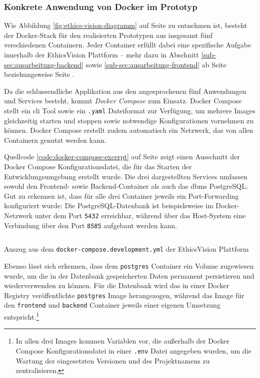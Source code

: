 \documentclass[a4paper,12pt,twoside,numbers=noendperiod]{scrreprt}
\begin{document}
\subsubsection*{Konkrete Anwendung von Docker im Prototyp}
\label{anwendung-docker}

Wie Abbildung \ref{fig:ethics-vision-diagramm} auf Seite \pageref{fig:ethics-vision-diagramm} zu entnehmen ist, besteht der Docker-Stack für den realisierten Prototypen aus insgesamt fünf verschiedenen Containern. Jeder Container erfüllt dabei eine spezifische Aufgabe innerhalb der EthicsVision Plattform -- mehr dazu in Abschnitt \ref{sub-sec:ausarbeitung-backend} sowie \ref{sub-sec:ausarbeitung-frontend} ab Seite \pageref{sub-sec:ausarbeitung-backend} beziehungsweise Seite \pageref{sub-sec:ausarbeitung-frontend}.

\medskip

Da die schlussendliche Applikation aus den angesprochenen fünf Anwendungen und Services besteht, kommt \textit{Docker Compose} zum Einsatz. Docker Compose stellt ein \ac{cli} Tool sowie ein \texttt{.yaml} Dateiformat zur Verfügung, um mehrere Images gleichzeitig starten und stoppen sowie notwendige Konfigurationen vornehmen zu können. Docker Compose erstellt zudem automatisch ein Netzwerk, das von allen Containern genutzt werden kann. \cite{montemagno_docker_2023, docker_inc_networking_compose_2023}

Quellcode \ref{code:docker-compose-excerpt} auf Seite \pageref{code:docker-compose-excerpt} zeigt einen Ausschnitt der Docker Compose Konfigurationsdatei, die für das Starten der Entwicklungsumgebung erstellt wurde. Die drei dargestellten Services umfassen sowohl den Frontend- sowie Backend-Container als auch das \ac{dbms} PostgreSQL. Gut zu erkennen ist, dass für alle drei Container jeweils ein Port-Forwarding konfiguriert wurde: Die PostgreSQL-Datenbank ist beispielsweise im Docker-Netzwerk unter dem Port \texttt{5432} erreichbar, während über das Host-System eine Verbindung über den Port \texttt{8585} aufgebaut werden kann. 

\begin{listing}[ht]
    \inputminted[fontsize=\footnotesize,linenos,xleftmargin=8mm]{yaml}{code/Luidold_Docker-Compose.yml}
    \caption{Auszug aus dem \texttt{docker-compose.development.yml} der EthicsVision Plattform}
    \label{code:docker-compose-excerpt}
\end{listing}

Ebenso lässt sich erkennen, dass dem \texttt{postgres} Container ein Volume zugewiesen wurde, um die in der Datenbank gespeicherten Daten permanent persistieren und wiederverwenden zu können. Für die Datenbank wird das in einer Docker Registry veröffentlichte \texttt{postgres} Image herangezogen, während das Image für den \texttt{frontend} und \texttt{backend} Container jeweils einer eigenen Umsetzung entspricht.\footnote{In allen drei Images kommen Variablen vor, die außerhalb der Docker Compose Konfigurationsdatei in einer \texttt{.env} Datei angegeben wurden, um die Wartung der eingesetzten Versionen und des Projektnamens zu zentralisieren.}
\end{document}
